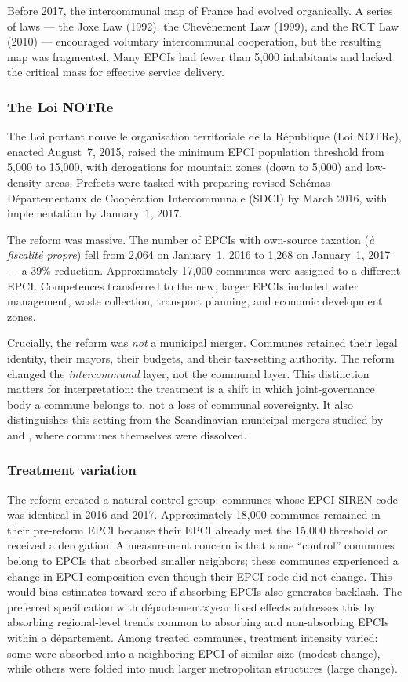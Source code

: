 \documentclass[12pt]{article}
\begin{document}
Before 2017, the intercommunal map of France had evolved organically. A series of laws --- the Joxe Law (1992), the Chev\`{e}nement Law (1999), and the RCT Law (2010) --- encouraged voluntary intercommunal cooperation, but the resulting map was fragmented. Many EPCIs had fewer than 5,000 inhabitants and lacked the critical mass for effective service delivery.

\subsubsection*{The Loi NOTRe} The Loi portant nouvelle organisation territoriale de la R\'{e}publique (Loi NOTRe), enacted August~7, 2015, raised the minimum EPCI population threshold from 5,000 to 15,000, with derogations for mountain zones (down to 5,000) and low-density areas. Prefects were tasked with preparing revised Sch\'{e}mas D\'{e}partementaux de Coop\'{e}ration Intercommunale (SDCI) by March 2016, with implementation by January~1, 2017.

The reform was massive. The number of EPCIs with own-source taxation (\textit{\`{a} fiscalit\'{e} propre}) fell from 2,064 on January~1, 2016 to 1,268 on January~1, 2017 --- a 39\% reduction. Approximately 17,000 communes were assigned to a different EPCI. Competences transferred to the new, larger EPCIs included water management, waste collection, transport planning, and economic development zones.

Crucially, the reform was \textit{not} a municipal merger. Communes retained their legal identity, their mayors, their budgets, and their tax-setting authority. The reform changed the \textit{intercommunal} layer, not the communal layer. This distinction matters for interpretation: the treatment is a shift in which joint-governance body a commune belongs to, not a loss of communal sovereignty. It also distinguishes this setting from the Scandinavian municipal mergers studied by \citet{lassen2006} and \citet{lapointe2023}, where communes themselves were dissolved.

\subsubsection*{Treatment variation} The reform created a natural control group: communes whose EPCI SIREN code was identical in 2016 and 2017. Approximately 18,000 communes remained in their pre-reform EPCI because their EPCI already met the 15,000 threshold or received a derogation. A measurement concern is that some ``control'' communes belong to EPCIs that absorbed smaller neighbors; these communes experienced a change in EPCI composition even though their EPCI code did not change. This would bias estimates toward zero if absorbing EPCIs also generates backlash. The preferred specification with d\'{e}partement$\times$year fixed effects addresses this by absorbing regional-level trends common to absorbing and non-absorbing EPCIs within a d\'{e}partement. Among treated communes, treatment intensity varied: some were absorbed into a neighboring EPCI of similar size (modest change), while others were folded into much larger metropolitan structures (large change).
\end{document}
